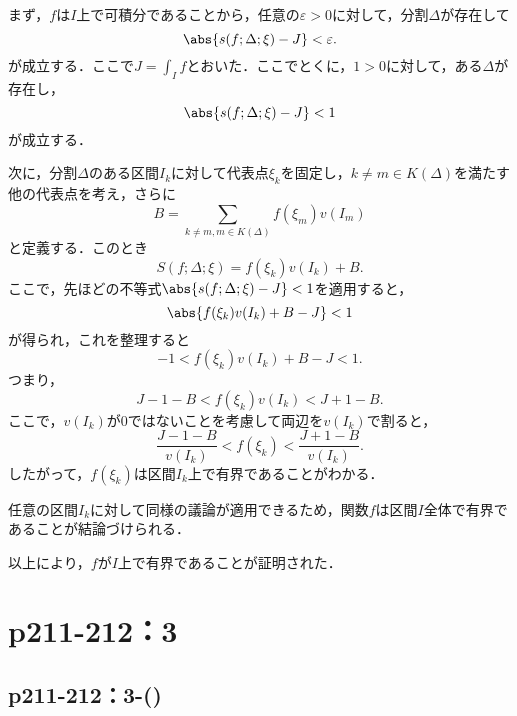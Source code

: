 \begin{tproof}
    まず，$f$は$I$上で可積分であることから，任意の$\varepsilon >0$に対して，分割$\Delta$が存在して
    \[
        \abs{s(f; \Delta; \xi) - J} < \varepsilon.
    \]
    が成立する．ここで$J = \int_I f$とおいた．ここでとくに，$1 >0$に対して，ある$\Delta$が存在し，
    \[
        \abs{ s(f; \Delta; \xi) - J } < 1
    \]
    が成立する．

    次に，分割$\Delta$のある区間$I_k$に対して代表点$\xi_k$を固定し，$k \ne m \in K(\Delta)$を満たす他の代表点を考え，さらに
    \[
        B = \sum_{k \ne m , m \in K(\Delta)} f(\xi_m) v(I_m)
    \]
    と定義する．このとき
    \[
        S(f; \Delta; \xi) = f(\xi_k) v(I_k) + B.
    \]
    ここで，先ほどの不等式$\abs{ s(f; \Delta; \xi) - J } < 1$を適用すると，
    \[
        \abs{ f(\xi_k) v(I_k) + B - J } < 1
    \]
    が得られ，これを整理すると
    \[
        -1 < f(\xi_k) v(I_k) + B - J < 1.
    \]
    つまり，
    \[
        J - 1 - B < f(\xi_k) v(I_k) < J + 1 - B.
    \]
    ここで，$v(I_k)$が$0$ではないことを考慮して両辺を$v(I_k)$で割ると，
    \[
        \frac{J - 1 - B}{v(I_k)} < f(\xi_k) < \frac{J + 1 - B}{v(I_k)}.
    \]
    したがって，$f(\xi_k)$は区間$I_k$上で有界であることがわかる．

    任意の区間$I_k$に対して同様の議論が適用できるため，関数$f$は区間$I$全体で有界であることが結論づけられる．

    以上により，$f$が$I$上で有界であることが証明された．
\end{tproof}


\section*{p211-212：3}


\subsection*{p211-212：3-()}

